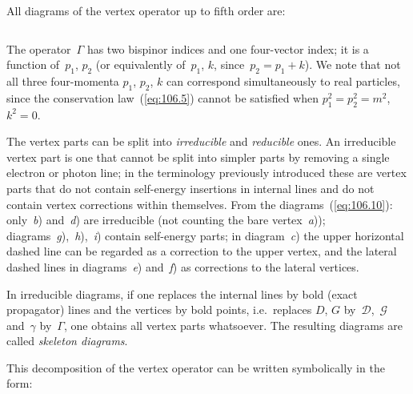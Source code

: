 All diagrams of the vertex operator up to fifth order are:

\begin{equation}
\label{eq:106.10}
\end{equation}

\noindent The operator~$\Gamma$ has two bispinor indices and one four-vector index; it is a function of~$p_1$, $p_2$ (or equivalently of~$p_1$, $k$, since~$p_2 = p_1 + k$). We note that not all three four-momenta $p_1$, $p_2$, $k$ can correspond simultaneously to real particles, since the conservation law~(\ref{eq:106.5}) cannot be satisfied when $p_1^2 = p_2^2 = m^2$, $k^2 = 0$.

The vertex parts can be split into \emph{irreducible} and \emph{reducible} ones. An irreducible vertex part is one that cannot be split into simpler parts by removing a single electron or photon line; in the terminology previously introduced these are vertex parts that do not contain self-energy insertions in internal lines and do not contain vertex corrections within themselves. From the diagrams~(\ref{eq:106.10}): only~\textit{b}) and~\textit{d}) are irreducible (not counting the bare vertex~\textit{a})); diagrams~\textit{g}),~\textit{h}),~\textit{i}) contain self-energy parts; in diagram~\textit{c}) the upper horizontal dashed line can be regarded as a correction to the upper vertex, and the lateral dashed lines in diagrams~\textit{e}) and~\textit{f}) as corrections to the lateral vertices.

In irreducible diagrams, if one replaces the internal lines by bold (exact propagator) lines and the vertices by bold points, i.e.\ replaces $D$, $G$ by~$\mathcal{D}$,~$\mathcal{G}$ and~$\gamma$ by~$\Gamma$, one obtains all vertex parts whatsoever. The resulting diagrams are called \emph{skeleton diagrams}.


This decomposition of the vertex operator can be written symbolically in the form:

\begin{equation}
\label{eq:106.11}
\end{equation}

